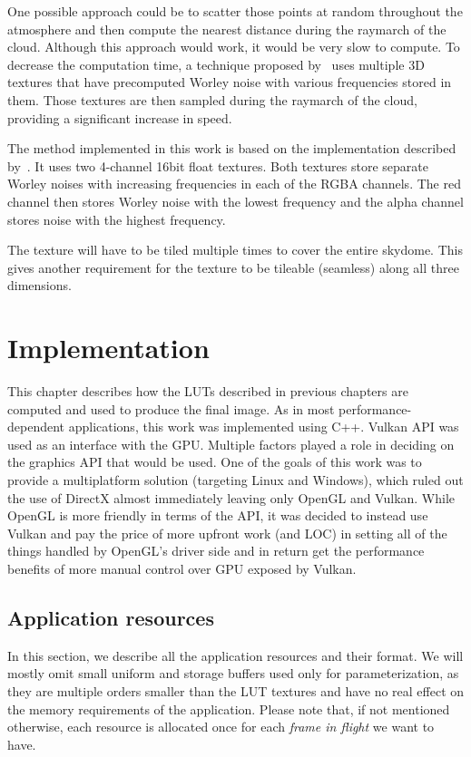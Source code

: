 \documentclass{ctuthesis}
\begin{document}
One possible approach could be to scatter those points at random throughout the atmosphere
and then compute the nearest distance during the raymarch of the cloud. Although this approach 
would work, it would be very slow to compute. To decrease the computation time, 
a technique proposed by~\cite{schneider2015real} uses multiple 3D textures that have
precomputed Worley noise with various frequencies stored in them. Those textures are then sampled
during the raymarch of the cloud, providing a significant increase in speed.

The method implemented in this work is based on the implementation described by~\cite{lague_2019}. It uses two 4-channel
16bit float textures. Both textures store separate Worley noises with increasing frequencies in each of the 
RGBA channels. The red channel then stores Worley noise with the lowest frequency and the alpha
channel stores noise with the highest frequency.

The texture will have to be tiled multiple times to cover the entire skydome. This gives another
requirement for the texture to be tileable (seamless) along all three dimensions. 

\chapter{Implementation}
This chapter describes how the LUTs described in previous chapters are computed and used to produce the final image.
As in most performance-dependent applications, this work was implemented using C++. Vulkan API was used as an 
interface with the GPU. Multiple factors played a role in deciding on the graphics API that would
be used. One of the goals of this work was to provide a multiplatform solution 
(targeting Linux and Windows), which ruled out the use of DirectX almost immediately leaving only
OpenGL and Vulkan. While OpenGL is more friendly in terms of the API, it was decided to instead use
Vulkan and pay the price of more upfront work (and LOC) in setting all of the things handled by OpenGL's
driver side and in return get the performance benefits of more manual control over GPU exposed by Vulkan.

\section{Application resources}
In this section, we describe all the application resources and their format. We will mostly omit small uniform 
and storage buffers used only for parameterization, as they are multiple orders smaller than the LUT textures and have 
no real effect on the memory requirements of the application. Please note that, if not mentioned otherwise, each 
resource is allocated once for each \textit{frame in flight} we want to have.
\end{document}
